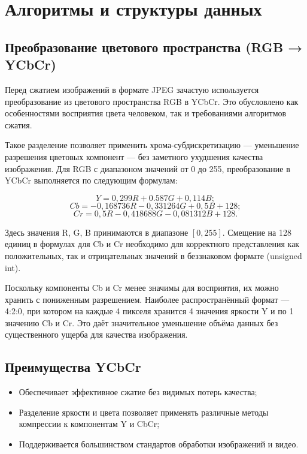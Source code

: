 \section{Алгоритмы и структуры данных}
\subsection{Преобразование цветового пространства (RGB → YCbCr)}

Перед сжатием изображений в формате JPEG зачастую используется преобразование из цветового пространства RGB в YCbCr. 
Это обусловлено как особенностями восприятия цвета человеком, так и требованиями алгоритмов сжатия.


Такое разделение позволяет применить хрома-субдискретизацию — уменьшение разрешения цветовых компонент — без заметного ухудшения качества изображения.
Для RGB с диапазоном значений от 0 до 255, преобразование в YCbCr выполняется по следующим формулам:

$$ Y = 0,299R + 0.587G + 0,114B; $$
$$ Cb = -0,168736R - 0,331264G + 0,5B + 128; $$ 
$$ Cr = 0,5R - 0,418688G - 0,081312B + 128. $$

Здесь значения R, G, B принимаются в диапазоне $[0, 255]$. 
Смещение на 128 единиц в формулах для Cb и Cr необходимо для корректного представления как положительных, так и отрицательных значений в беззнаковом формате (unsigned int).

Поскольку компоненты Cb и Cr менее значимы для восприятия, их можно хранить с пониженным разрешением. 
Наиболее распространённый формат — 4:2:0, при котором на каждые 4 пикселя хранится 4 значения яркости Y и по 1 значению Cb и Cr. 
Это даёт значительное уменьшение объёма данных без существенного ущерба для качества изображения.



\subsection{Преимущества YCbCr}
    \begin{itemize}
        \item Обеспечивает эффективное сжатие без видимых потерь качества;
        \item Разделение яркости и цвета позволяет применять различные методы компрессии к компонентам Y и CbCr;
        \item Поддерживается большинством стандартов обработки изображений и видео.
    \end{itemize}

